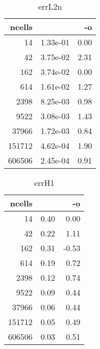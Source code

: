 \documentclass[11pt]{article}
\begin{document}
\begin{table}[!htbp]
\begin{center}
\begin{tabular}{r||r|r}
ncells           &                  & -o              \\\hline\hline
             14&  1.33e-01&    0.00\\\hline
             42&  3.75e-02&    2.31\\\hline
            162&  3.74e-02&    0.00\\\hline
            614&  1.61e-02&    1.27\\\hline
           2398&  8.25e-03&    0.98\\\hline
           9522&  3.08e-03&    1.43\\\hline
          37966&  1.72e-03&    0.84\\\hline
         151712&  4.62e-04&    1.90\\\hline
         606506&  2.45e-04&    0.91\\\hline
\end{tabular}
\caption{errL2n}
\end{center}
\label{tab:errL2n}
\end{table}
%
%
\begin{table}[!htbp]
\begin{center}
\begin{tabular}{r||r|r}
ncells           &                  & -o              \\\hline\hline
             14&      0.40&    0.00\\\hline
             42&      0.22&    1.11\\\hline
            162&      0.31&   -0.53\\\hline
            614&      0.19&    0.72\\\hline
           2398&      0.12&    0.74\\\hline
           9522&      0.09&    0.44\\\hline
          37966&      0.06&    0.44\\\hline
         151712&      0.05&    0.49\\\hline
         606506&      0.03&    0.51\\\hline
\end{tabular}
\caption{errH1}
\end{center}
\label{tab:errH1}
\end{table}
%
%
\end{document}
